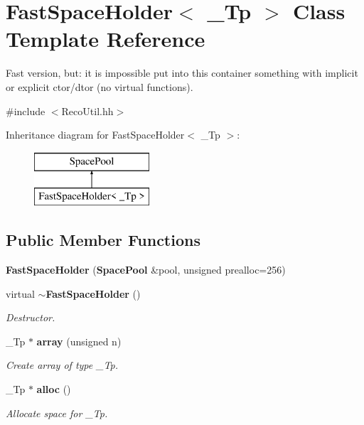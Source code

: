 \section{Fast\-Space\-Holder$<$ \-\_\-\-Tp $>$ Class Template Reference}
\label{classFastSpaceHolder}


Fast version, but\-: it is impossible put into this container something with implicit or explicit ctor/dtor (no virtual functions).  




{\ttfamily \#include $<$Reco\-Util.\-hh$>$}

Inheritance diagram for Fast\-Space\-Holder$<$ \-\_\-\-Tp $>$\-:\begin{figure}[H]
\begin{center}
\leavevmode
\includegraphics[height=2.000000cm]{classFastSpaceHolder}
\end{center}
\end{figure}
\subsection*{Public Member Functions}
\begin{DoxyCompactItemize}
\item 
{\bfseries Fast\-Space\-Holder} ({\bf Space\-Pool} \&pool, unsigned prealloc=256)\label{classFastSpaceHolder_a167f87252ec3e7efe1733d7471f873af}

\item 
virtual {\bf $\sim$\-Fast\-Space\-Holder} ()\label{classFastSpaceHolder_a9159af3587150c073efbdf9767675eae}

\begin{DoxyCompactList}\small\item\em Destructor. \end{DoxyCompactList}\item 
\-\_\-\-Tp $\ast$ {\bf array} (unsigned n)
\begin{DoxyCompactList}\small\item\em Create array of type \-\_\-\-Tp. \end{DoxyCompactList}\item 
\-\_\-\-Tp $\ast$ {\bf alloc} ()\label{classFastSpaceHolder_a0ad44bb4cc8378a4f5596c523ea1c8a9}

\begin{DoxyCompactList}\small\item\em Allocate space for \-\_\-\-Tp. \end{DoxyCompactList}\end{DoxyCompactItemize}
